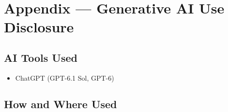 \documentclass[10pt,titlepage]{article}
\begin{document}
\section{Appendix --- Generative AI Use Disclosure}
\subsection{AI Tools Used}

\begin{itemize}
    \item ChatGPT (GPT-6.1 Sol, GPT-6)
\end{itemize}

\subsection{How and Where Used}
\end{document}
